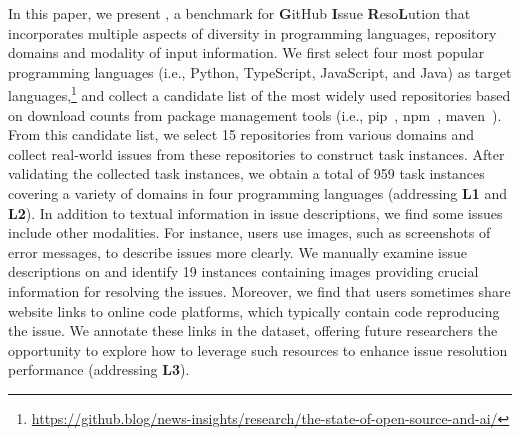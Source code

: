 In this paper, we present \textbf{\Swebenchx}, a benchmark for \textbf{G}itHub \textbf{I}ssue \textbf{R}eso\textbf{L}ution that incorporates multiple aspects of diversity in programming languages, repository domains and modality of input information. %
We first select four most popular programming languages (i.e., Python, TypeScript, JavaScript, and Java) as target languages,\footnote{\url{https://github.blog/news-insights/research/the-state-of-open-source-and-ai/}} and collect a candidate list of the most widely used repositories based on download counts from package management tools (i.e., pip~\cite{pip}, npm~\cite{npm}, maven~\cite{maven}). From this candidate list, we select 15 repositories %
from various domains and collect real-world issues from these repositories to construct task instances. After validating the collected task instances, we obtain a total of 959 task instances covering a variety of domains %
in four programming languages (addressing \textbf{L1} and \textbf{L2}). In addition to textual information in issue descriptions, we find some issues include other modalities. For instance, users use images, such as screenshots of error messages, to describe issues more clearly.  We manually examine issue descriptions on \Swebenchx and identify 19 instances containing images providing crucial information for resolving the issues. %
Moreover, we find that users sometimes share website links to online code platforms, which typically contain code reproducing the issue.  We annotate these links in the dataset, offering future researchers the opportunity to explore how to leverage such resources to enhance issue resolution performance (addressing \textbf{L3}).




